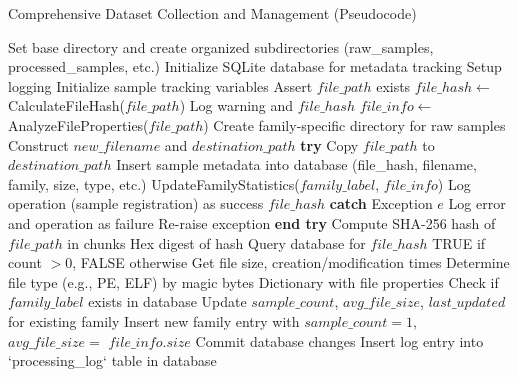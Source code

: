 \begin{algorithm}[!htbp]
\caption{Comprehensive Dataset Collection and Management (Pseudocode)}
\label{alg:dataset-collection}
\begin{algorithmic}[1]
    \State Set base directory and create organized subdirectories (raw\_samples, processed\_samples, etc.)
    \State Initialize SQLite database for metadata tracking
    \State Setup logging
    \State Initialize sample tracking variables
\EndProcedure
\Statex
{}
    \State Assert $file\_path$ exists
    \State $file\_hash \leftarrow$ CalculateFileHash($file\_path$)
     Log warning and \Return $file\_hash$ \EndIf
    \State $file\_info \leftarrow$ AnalyzeFileProperties($file\_path$)
    \State Create family-specific directory for raw samples
    \State Construct $new\_filename$ and $destination\_path$
    \State \textbf{try}
        \State Copy $file\_path$ to $destination\_path$
        \State Insert sample metadata into database (file\_hash, filename, family, size, type, etc.)
        \State UpdateFamilyStatistics($family\_label$, $file\_info$)
        \State Log operation (sample registration) as success
        \Return $file\_hash$
    \State \textbf{catch} {Exception $e$}
        \State Log error and operation as failure
        \State Re-raise exception
    \State \textbf{end try}
\EndProcedure
\Statex
{}
    \State Compute SHA-256 hash of $file\_path$ in chunks
    \Return Hex digest of hash
\EndFunction
\Statex
{}
    \State Query database for $file\_hash$
    \Return TRUE if count $> 0$, FALSE otherwise
\EndFunction
\Statex
{}
    \State Get file size, creation/modification times
    \State Determine file type (e.g., PE, ELF) by magic bytes
    \Return Dictionary with file properties
\EndFunction
\Statex
{}
    \State Check if $family\_label$ exists in database
        \State Update $sample\_count$, $avg\_file\_size$, $last\_updated$ for existing family
    \Else
        \State Insert new family entry with $sample\_count=1$, $avg\_file\_size=$ $file\_info.size$
    \EndIf
    \State Commit database changes
\EndProcedure
\Statex
{}
    \State Insert log entry into `processing\_log` table in database

\end{algorithmic}
\end{algorithm}
